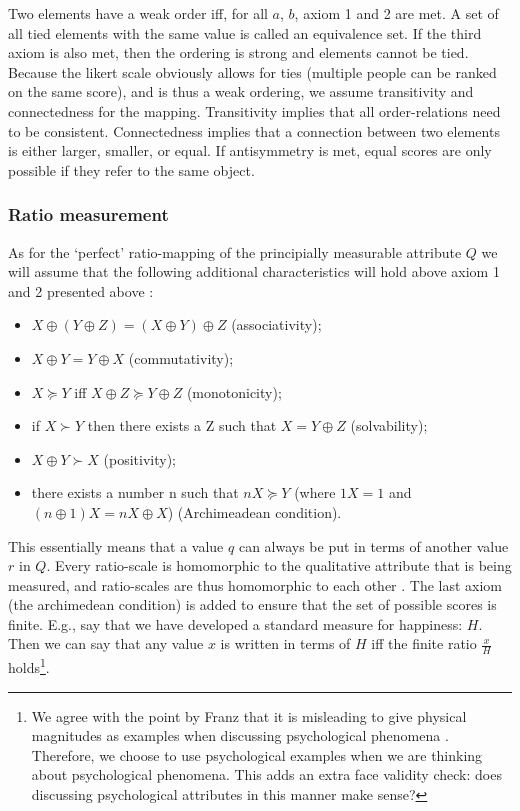 \documentclass[utf8]{FrontiersinVancouver}
\begin{document}
Two elements have a weak order iff, for all $a$, $b$, axiom 1 and 2 are met. A set of all tied elements with the same value is called an equivalence set. If the third axiom is also met, then the ordering is strong and elements cannot be tied. Because the likert scale obviously allows for ties (multiple people can be ranked on the same score), and is thus a weak ordering, we assume transitivity and connectedness for the mapping. Transitivity implies that all order-relations need to be consistent. Connectedness implies that a connection between two elements is either larger, smaller, or equal. If antisymmetry is met, equal scores are only possible if they refer to the same object. 

\subsubsection{Ratio measurement}
As for the `perfect' ratio-mapping of the principially measurable attribute $Q$ we will assume that the following additional characteristics will hold above axiom 1 and 2 presented above \citep{krantzFoundationsMeasurement1971}:

\begin{itemize}
    \item $X \oplus (Y \oplus Z) = (X \oplus Y) \oplus Z$ (associativity);
    \item $X \oplus Y = Y \oplus X$ (commutativity);
    \item $X \succeq Y$ iff $X \oplus Z \succeq Y \oplus Z$ (monotonicity);
    \item if $X \succ Y$ then there exists a Z such that $X = Y \oplus Z$ (solvability);
    \item $X \oplus Y \succ X$ (positivity);
    \item there exists a number n such that $nX \succeq Y$ (where $1X = 1$ and $(n \oplus 1) X = nX \oplus X$) (Archimeadean condition).
\end{itemize}

This essentially means that a value $q$ can always be put in terms of another value $r$ in $Q$. Every ratio-scale is homomorphic to the qualitative attribute that is being measured, and ratio-scales are thus homomorphic to each other \citep{michellAxiomsQuantityTheory1997}. The last axiom (the archimedean condition) is added to ensure that the set of possible scores is finite. E.g., say that we have developed a standard measure for happiness: $H$. Then we can say that any value $x$ is written in terms of $H$ iff the finite ratio $\frac{x}{H}$ holds\footnote{We agree with the point by Franz that it is misleading to give physical magnitudes as examples when discussing psychological phenomena \citep{franzArePsychologicalAttributes2022}. Therefore, we choose to use psychological examples when we are thinking about psychological phenomena. This adds an extra face validity check: does discussing psychological attributes in this manner make sense?}.
\end{document}

